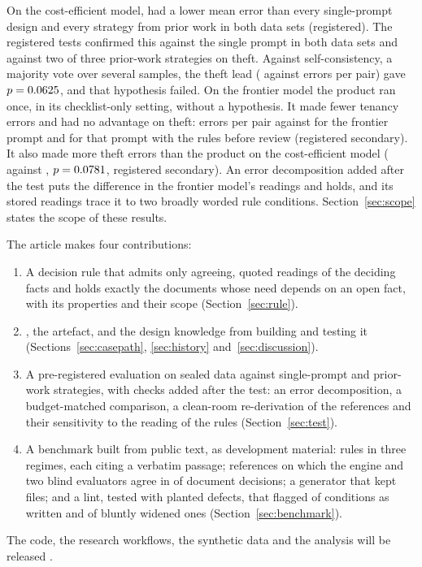 On the cost-efficient model, \casepath had a lower mean error than every single-prompt design and every strategy from prior work in both data sets (registered). The registered tests confirmed this against the single prompt in both data sets and against two of three prior-work strategies on theft. Against self-consistency, a majority vote over several samples, the theft lead (\sthreeHFourSCA{} against \sthreeHFourSCB{} errors per pair) gave $p= 0.0625$, and that hypothesis failed. On the frontier model the product ran once, in its checklist-only setting, without a hypothesis. It made fewer tenancy errors and had no advantage on theft: \sthreeSecSevenAA{} errors per pair against \sthreeSecSevenAB{} for the frontier prompt and \sthreeRicOrigFrontierThErrors{} for that prompt with the rules before review (registered secondary). It also made more theft errors than the product on the cost-efficient model (\sthreeSecSevenCA{} against \sthreeSecSevenCB, $p= 0.0781$, registered secondary). An error decomposition added after the test puts the difference in the frontier model's readings and holds, and its stored readings trace it to two broadly worded rule conditions. Section~\ref{sec:scope} states the scope of these results.

The article makes four contributions:
\begin{enumerate}[leftmargin=1.5em]
\item A decision rule that admits only agreeing, quoted readings of the deciding facts and holds exactly the documents whose need depends on an open fact, with its properties and their scope (Section~\ref{sec:rule}).
\item \casepath, the artefact, and the design knowledge from building and testing it (Sections~\ref{sec:casepath}, \ref{sec:history} and~\ref{sec:discussion}).
\item A pre-registered evaluation on sealed data against single-prompt and prior-work strategies, with checks added after the test: an error decomposition, a budget-matched comparison, a clean-room re-derivation of the references and their sensitivity to the reading of the rules (Section~\ref{sec:test}).
\item A benchmark built from public text, as development material: \sfourdevAllRules{} rules in three regimes, each citing a verbatim passage; references on which the engine and two blind evaluators agree in \sfourdevCleanroomSame{} of \sfourdevCleanroomDocuments{} document decisions; a generator that kept \sfourdevAllFiles{} files; and a lint, tested with planted defects, that flagged \sfourdevLintUntouchedFlagged{} of \sfourdevLintUntouched{} conditions as written and \sfourdevLintBluntDetected{} of \sfourdevLintBluntPlanted{} bluntly widened ones (Section~\ref{sec:benchmark}).
\end{enumerate}
The code, the research workflows, the synthetic data and the analysis will be released \cite{casepath2026repo}.
